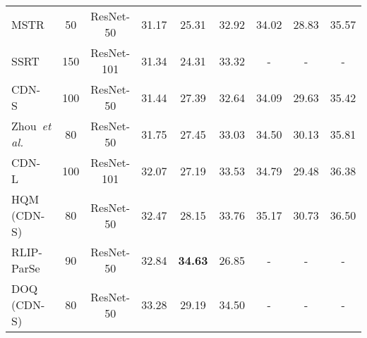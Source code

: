 \documentclass[10pt,twocolumn,letterpaper]{article}
\def\etal{\textit{et al. }}
\begin{document}
\begin{table*}[!t]
\begin{minipage}{0.64\linewidth}
{\begin{tabular}{@{}ccccccccc@{}}
\multicolumn{1}{l|}{MSTR~\cite{Kim_2022_CVPR}}              & \multicolumn{1}{c|}{50}              & \multicolumn{1}{c|}{ResNet-50}       & 31.17           & 25.31            & \multicolumn{1}{c|}{32.92}             & 34.02            & 28.83            & 35.57             \\
                \multicolumn{1}{l|}{SSRT~\cite{iftekhar2022look}}           & \multicolumn{1}{c|}{150}             & \multicolumn{1}{c|}{ResNet-101}      & 31.34           & 24.31            & \multicolumn{1}{c|}{33.32}             & -                & -                & -                 \\
                \multicolumn{1}{l|}{CDN-S~\cite{zhang2021mining}}           & \multicolumn{1}{c|}{100}             & \multicolumn{1}{c|}{ResNet-50}       & 31.44           & 27.39            & \multicolumn{1}{c|}{32.64}             & 34.09            & 29.63            & 35.42             \\
                \multicolumn{1}{l|}{Zhou~\etal\cite{zhou2022human}}         & \multicolumn{1}{c|}{80}              & \multicolumn{1}{c|}{ResNet-50}       & 31.75           & 27.45            & \multicolumn{1}{c|}{33.03}             & 34.50            & 30.13            & 35.81             \\
\multicolumn{1}{l|}{CDN-L~\cite{zhang2021mining}}           & \multicolumn{1}{c|}{100}             & \multicolumn{1}{c|}{ResNet-101}      & 32.07           & 27.19            & \multicolumn{1}{c|}{33.53}             & 34.79            & 29.48            & 36.38             \\
                \multicolumn{1}{l|}{HQM (CDN-S)~\cite{zhong2022towards}}    & \multicolumn{1}{c|}{80}              & \multicolumn{1}{c|}{ResNet-50}       & 32.47           & 28.15            & \multicolumn{1}{c|}{33.76}             & 35.17            & 30.73            & 36.50             \\
                \multicolumn{1}{l|}{RLIP-ParSe~\cite{yuan2022rlip}}         & \multicolumn{1}{c|}{90}              & \multicolumn{1}{c|}{ResNet-50}       & 32.84           & \textbf{34.63}   & \multicolumn{1}{c|}{26.85}             & -                & -                & -                 \\
                \multicolumn{1}{l|}{DOQ (CDN-S)~\cite{qu2022distillation}}  & \multicolumn{1}{c|}{80}              & \multicolumn{1}{c|}{ResNet-50}       & 33.28           & 29.19            & \multicolumn{1}{c|}{34.50}             & -                & -                & -                 \\

\end{tabular}}
\end{minipage}
\end{table*}
\end{document}
